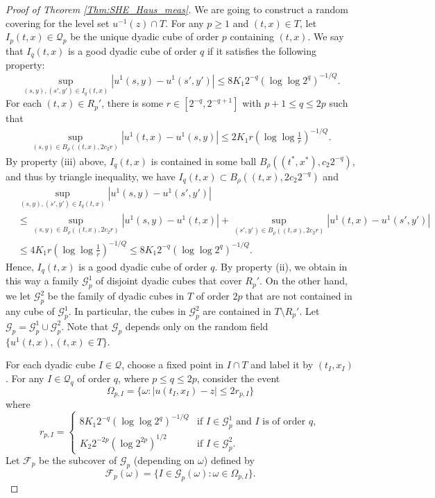 \documentclass[11pt, reqno]{amsart}
\numberwithin{equation}{section}
\begin{document}
\begin{proof}[Proof of Theorem \ref{Thm:SHE_Haus_meas}]
We are going to construct a random covering for the level set $u^{-1}(z) \cap T$. For any $p \ge 1$ and $(t, x) \in T$, 
let $I_p(t, x) \in \mathscr{Q}_p$ be the unique dyadic cube of order $p$ containing $(t, x)$. 
We say that $I_q(t, x)$ is a good dyadic cube of order $q$ if it satisfies the following property:
\begin{equation}\label{Eq:good_dyadic_cube}
\sup_{(s, y), (s',y') \in I_q(t, x)} |u^1(s, y) - u^1(s',y')| \le 8 K_1 2^{-q}(\log\log 2^q)^{-1/Q}. 
\end{equation}
For each $(t, x) \in R_p'$, there is some $r \in [2^{-q}, 2^{-q+1}]$ with $p+1 \le q \le 2p$ such that
\begin{align*}
\sup_{(s, y) \in B_\rho((t, x), 2c_2r)}|u^1(t, x) - u^1(s, y)| \le 2K_1 r\left(\log\log\frac{1}{r}\right)^{-1/Q}.
\end{align*}
By property (iii) above, $I_q(t, x)$ is contained in some ball $B_\rho((t^*,x^*),c_2 2^{-q})$, and thus by triangle 
inequality, we have
$I_q(t,x) \subset B_\rho((t,x),2c_2 2^{-q})$ and
\begin{align*}
&\sup_{(s, y), (s', y') \in I_q(t, x)}|u^1(s, y) - u^1(s', y')|\\
&\le \sup_{(s, y) \in B_\rho((t, x), 2c_2r)}|u^1(s, y) - u^1(t, x)| + \sup_{(s', y') \in B_\rho((t, x), 2c_2r)}|u^1(t, x) - u^1(s', y')|\\
& \le 4K_1 r\left(\log\log\frac{1}{r}\right)^{-1/Q} \le 8K_1 2^{-q}(\log\log 2^q)^{-1/Q}.
\end{align*}
Hence, $I_q(t, x)$ is a good dyadic cube of order $q$.
By property (ii), we obtain in this way a family $\mathscr{G}_p^1$ of disjoint dyadic cubes that cover $R_p'$.
On the other hand, we let $\mathscr{G}_p^2$ be the family of dyadic cubes in $T$ of order $2p$ that are not 
contained in any cube of $\mathscr{G}_p^1$. In particular, the cubes in $\mathscr{G}_p^2$ are contained in $T \setminus R_p'$. 
Let $\mathscr{G}_p = \mathscr{G}_p^1 \cup 
\mathscr{G}_p^2$. Note that $\mathscr{G}_p$ depends only on the random field $\{ u^1(t, x), (t, x) \in T\}$.

For each dyadic cube $I \in \mathscr{Q}$, choose a fixed point in $I \cap T$ and label it by $(t_I, x_I)$.
For any $I \in \mathscr{Q}_q$ of order $q$, where $p \le q \le 2p$, consider the event
\[ \Omega_{p,I} = \{ \omega :  |u(t_I, x_I) - z| \le 2 r_{p,I} \} \]
where
\[ r_{p,I} = \begin{cases}
8 K_1 2^{-q}(\log\log2^q)^{-1/Q} & \text{if } I \in \mathscr{G}_p^1 \text{ and } I \text{ is of order } q,\\
K_2 2^{-2p} (\log 2^{2p})^{1/2} & \text{if } I \in \mathscr{G}_p^2.
\end{cases} \]
Let $\mathscr{F}_p$ be the subcover of $\mathscr{G}_p$ (depending on $\omega$) defined by
\[ \mathscr{F}_p(\omega) = \{ I \in \mathscr{G}_p(\omega) : \omega \in \Omega_{p,I} \}. \]


\end{proof}
\end{document}

